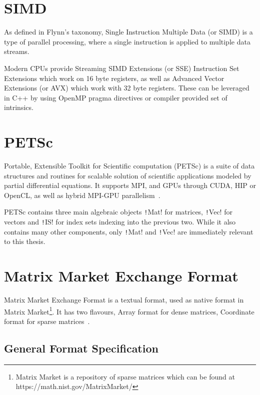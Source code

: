 \documentclass[thesis=M,english]{FITthesis}[2019/12/23]
\newcommand{\csre}[1]{\texttt!#1!}
\begin{document}
\section{SIMD}\label{tech:simd}

As defined in Flynn's taxonomy, Single Instruction Multiple Data (or SIMD) is a type of parallel
processing, where a single instruction is applied to multiple data streams.

Modern CPUs provide Streaming SIMD Extensions (or SSE) Instruction Set Extensions which work on 16 byte
registers, as well as Advanced Vector Extensions (or AVX) which work with 32 byte registers.
These can be leveraged in C++ by using OpenMP pragma directives or compiler provided set of intrinsics.

\section{PETSc}\label{tech:petsc}

Portable, Extensible Toolkit for Scientific computation (PETSc) is a suite of data structures and routines
for scalable solution of scientific applications modeled by partial differential equations.
It supports MPI, and GPUs through CUDA, HIP or OpenCL, as well as hybrid MPI-GPU parallelism~\cite{petsc-web-page}.

PETSc contains three main algebraic objects \csre{Mat} for matrices, \csre{Vec} for vectors and \csre{IS}
for index sets indexing into the previous two. While it also contains many other components, only \csre{Mat}
and \csre{Vec} are immediately relevant to this thesis.


\section{Matrix Market Exchange Format}\label{theory:MMEF}

Matrix Market Exchange Format is a textual format, used as native format in Matrix Market\footnote{
    Matrix Market is a repository of sparse matrices which can be found at https://math.nist.gov/MatrixMarket/
}.
It has two flavours, Array format for dense matrices, Coordinate format for sparse matrices~\cite{mmef}.


\subsection{General Format Specification}
\end{document}
